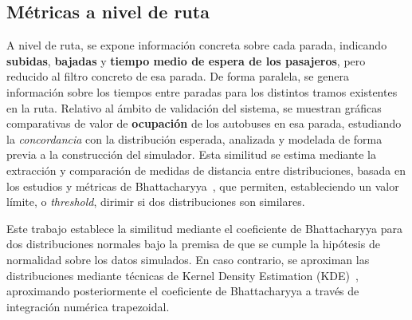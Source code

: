 \subsection{Métricas a nivel de ruta}
A nivel de ruta, se expone información concreta sobre cada parada, indicando \textbf{subidas}, \textbf{bajadas}
y \textbf{tiempo medio de espera de los pasajeros}, pero reducido al filtro concreto de esa parada.
De forma paralela, se genera información sobre los tiempos entre paradas para los distintos tramos existentes en 
la ruta. 
Relativo al ámbito de validación del sistema, se muestran gráficas comparativas de valor de \textbf{ocupación}
de los autobuses en esa parada, estudiando la \textit{concordancia} con la distribución esperada, analizada
y modelada de forma previa a la construcción del simulador. Esta similitud se 
estima mediante la extracción y comparación de medidas de distancia entre distribuciones, basada en los estudios
y métricas de Bhattacharyya~\cite{bhattacharyya1946divergence}, que permiten, estableciendo un valor límite, o \textit{
    threshold}, dirimir si dos distribuciones son similares.

Este trabajo establece la similitud mediante el coeficiente de Bhattacharyya para dos distribuciones normales bajo
la premisa de que se cumple la hipótesis de normalidad sobre los datos simulados. En caso contrario, se aproximan 
las distribuciones mediante técnicas de Kernel Density Estimation (KDE)~\cite{silverman1986density}, 
aproximando posteriormente el coeficiente de Bhattacharyya a través de integración numérica trapezoidal.

